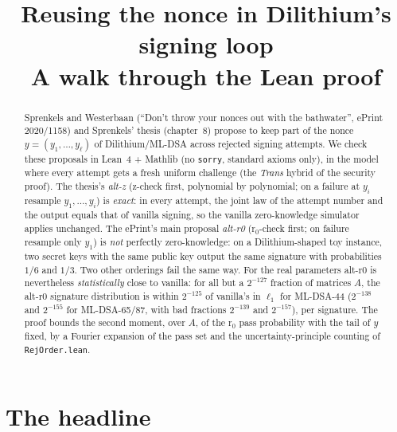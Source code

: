 \documentclass[11pt]{article}
\title{Reusing the nonce in Dilithium's signing loop\\
\large A walk through the Lean proof \lean{Bathwater.lean}}
\author{}\date{}
\theoremstyle{definition}
\theoremstyle{remark}
\newcommand{\lean}[1]{\texttt{#1}}
\begin{document}
\maketitle

\begin{center}
\end{center}

\begin{abstract}
Sprenkels and Westerbaan (``Don't throw your nonces out with the bathwater'', ePrint 2020/1158)
and Sprenkels' thesis (chapter~8) propose to keep part of the nonce $y=(y_1,\dots,y_\ell)$ of
Dilithium/ML-DSA across rejected signing attempts. We check these proposals in Lean~4 + Mathlib
(no \lean{sorry}, standard axioms only), in the model where every attempt gets a fresh uniform
challenge (the \emph{Trans} hybrid of the security proof). The thesis's \emph{alt-z} (z-check
first, polynomial by polynomial; on a failure at $y_i$ resample $y_1,\dots,y_i$) is
\emph{exact}: in every attempt, the joint law of the attempt number and the output equals that of
vanilla signing, so the vanilla zero-knowledge simulator applies unchanged. The ePrint's main
proposal \emph{alt-r0} (r$_0$-check first; on failure resample only $y_1$) is \emph{not}
perfectly zero-knowledge: on a Dilithium-shaped toy instance, two secret keys with the same public
key output the same signature with probabilities $1/6$ and $1/3$. Two other orderings fail the
same way. For the real parameters alt-r0 is nevertheless \emph{statistically} close to vanilla:
for all but a $2^{-127}$ fraction of matrices $A$, the alt-r0 signature distribution is within
$2^{-125}$ of vanilla's in $\ell_1$ for ML-DSA-44 ($2^{-138}$ and $2^{-155}$ for ML-DSA-65/87, with
bad fractions $2^{-139}$ and $2^{-157}$), per signature. The proof bounds the second moment, over $A$,
of the r$_0$ pass probability with the tail of $y$ fixed, by a Fourier expansion of the pass set
and the uncertainty-principle counting of \lean{RejOrder.lean}.
\end{abstract}

\tableofcontents

\section{The headline}\label{sec:headline}
\end{document}
